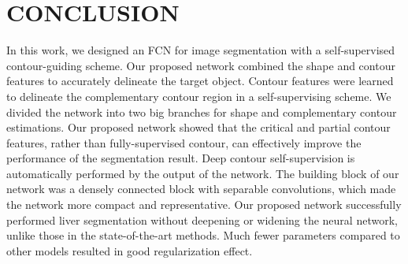 \documentclass[journal]{IEEEtran}
\begin{document}

\section{CONCLUSION}
In this work, we designed an FCN for image segmentation with a self-supervised contour-guiding scheme. Our proposed network combined the shape and contour features to accurately delineate the target object. Contour features were learned to delineate the complementary contour region in a self-supervising scheme. We divided the network into two big branches for shape and complementary contour estimations. Our proposed network showed that the critical and partial contour features, rather than fully-supervised contour, can effectively improve the performance of the segmentation result. Deep contour self-supervision is automatically performed by the output of the network. The building block of our network was a densely connected block with separable convolutions, which made the network more compact and representative. Our proposed network successfully performed liver segmentation without deepening or widening the neural network, unlike those in the state-of-the-art methods. Much fewer parameters compared to other models resulted in good regularization effect.


\end{document}
